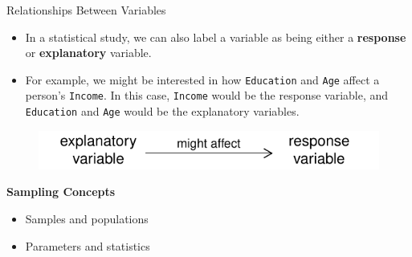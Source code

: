 \documentclass[10pt]{beamer}
\begin{document}
\begin{frame}{Relationships Between Variables}
\begin{itemize}
\item In a statistical study, we can also label a variable as being either a \textbf{response} or \textbf{explanatory} variable.
\vspace{10pt} 
\item For example, we might be interested in how \texttt{Education} and \texttt{Age} affect a person's \texttt{Income}.  In this case, \texttt{Income} would be the response variable, and \texttt{Education} and \texttt{Age} would be the explanatory variables.
\vspace{5pt}
\end{itemize} 
\begin{figure}
\includegraphics[scale=0.75]{figure/variables.pdf}
\end{figure}
\end{frame}

\begin{frame}
\large \textbf{Sampling Concepts}
\begin{itemize}
\item Samples and populations
\item Parameters and statistics
\end{itemize}
\end{frame}
\end{document}
